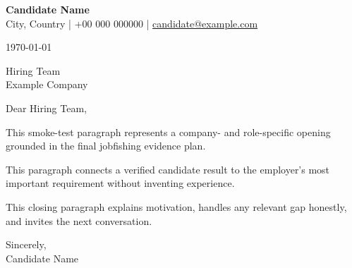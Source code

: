 \documentclass[11pt,a4paper]{article}
\begin{document}
{\Large\bfseries Candidate Name}\\
City, Country \quad | \quad +00 000 000000 \quad | \quad
\href{mailto:candidate@example.com}{candidate@example.com}

\vspace{1.2em}
\today

\vspace{1.2em}
Hiring Team\\
Example Company

\vspace{1.2em}
Dear Hiring Team,

This smoke-test paragraph represents a company- and role-specific opening grounded in the final jobfishing evidence plan.

This paragraph connects a verified candidate result to the employer's most important requirement without inventing experience.

This closing paragraph explains motivation, handles any relevant gap honestly, and invites the next conversation.

Sincerely,\\[1.2em]
Candidate Name
\end{document}
